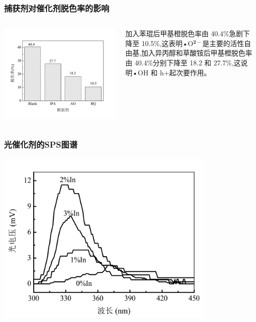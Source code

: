 \documentclass[xetex,compress]{mybeamer}
\begin{document}
\begin{frame}
\frametitle{捕获剂对催化剂脱色率的影响}
\begin{columns}
\begin{block}{}
\centering
\includegraphics[width=\linewidth]{figures/三氧化二铟捕获剂.jpg} 
\end{block}
\begin{block}{}
加入苯琨后甲基橙脱色率由 40.4\%急剧下降至 10.5\%,这表明•O$ \mathbf{^{2-}} $是主要的活性自由基,加入异丙醇和草酸铵后甲基橙脱色率由 40.4\%分别下降至 18.2 和 27.7\%,这说明•OH 和 h+起次要作用。
\end{block}
\end{columns}
\end{frame}

\begin{frame}
\frametitle{光催化剂的SPS图谱}
\begin{block}{}
\centering
\includegraphics[width=0.8\textwidth]{figures/三氧化二铟SPS.jpg} 
\end{block}
\end{frame}
\end{document}
